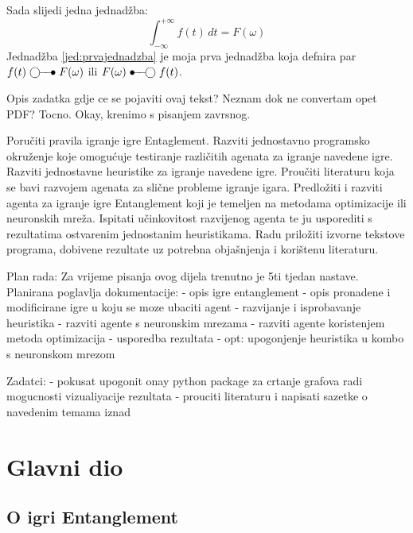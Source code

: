 \documentclass[zavrsnirad]{fer}
\begin{document}
Sada slijedi jedna jednadžba:
\begin{equation}
  \label{jed:prvajednadzba}
  \int_{-\infty}^{+\infty}f(t)\,dt=F(\omega)
\end{equation}
Jednadžba \eqref{jed:prvajednadzba} je moja prva jednadžba koja defnira par $f(t)\ufrek F(\omega)$ ili $F(\omega)\uvrem f(t)$.

Opis zadatka gdje ce se pojaviti ovaj tekst? Neznam dok ne convertam opet PDF? Tocno.
Okay, krenimo s pisanjem zavrsnog.

Poručiti pravila igranje igre Entaglement. Razviti jednostavno programsko okruženje koje omogućuje testiranje različitih agenata za igranje navedene igre. Razviti jednostavne heuristike za igranje navedene igre. Proučiti literaturu koja se bavi razvojem agenata za slične probleme igranje igara. Predložiti i razviti agenta za igranje igre Entanglement koji je temeljen na metodama optimizacije ili neuronskih mreža. Ispitati učinkovitost razvijenog agenta te ju usporediti s rezultatima ostvarenim jednostanim heuristikama. Radu priložiti izvorne tekstove programa, dobivene rezultate uz potrebna objašnjenja i korištenu literaturu.

Plan rada:
Za vrijeme pisanja ovog dijela trenutno je 5ti tjedan nastave.
Planirana poglavlja dokumentacije:
- opis igre entanglement
- opis pronadene i modificirane igre u koju se moze ubaciti agent
- razvijanje i isprobavanje heuristika
- razviti agente s neuronskim mrezama
- razviti agente koristenjem metoda optimizacija
- usporedba rezultata
- opt: upogonjenje heuristika u kombo s neuronskom mrezom

Zadatci:
- pokusat upogonit onay python package za crtanje grafova radi mogucnosti vizualiyacije rezultata
- prouciti literaturu i napisati sazetke o navedenim temama iznad



\chapter{Glavni dio}
\label{pog:glavni_dio}

\section{O igri Entanglement}
\label{pog:o_igri}
\end{document}
